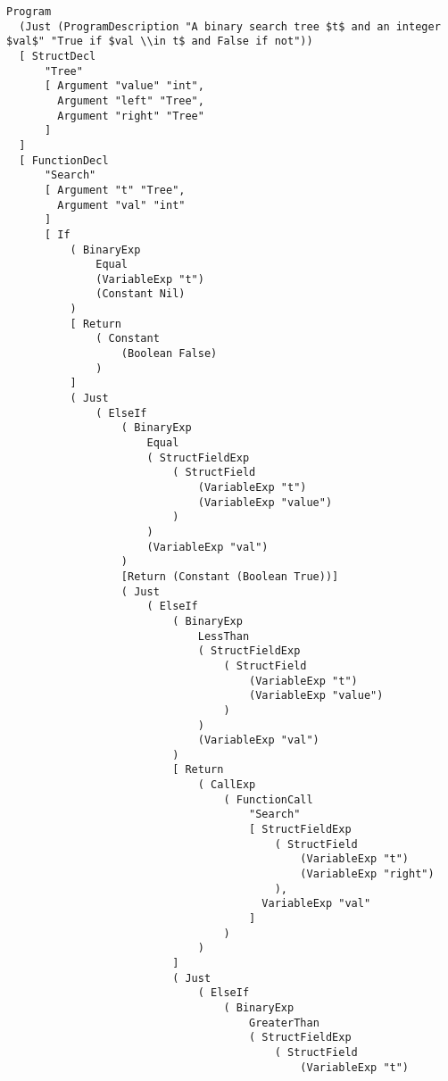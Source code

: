 \begin{lstlisting}
Program
  (Just (ProgramDescription "A binary search tree $t$ and an integer $val$" "True if $val \\in t$ and False if not"))
  [ StructDecl
      "Tree"
      [ Argument "value" "int",
        Argument "left" "Tree",
        Argument "right" "Tree"
      ]
  ]
  [ FunctionDecl
      "Search"
      [ Argument "t" "Tree",
        Argument "val" "int"
      ]
      [ If
          ( BinaryExp
              Equal
              (VariableExp "t")
              (Constant Nil)
          )
          [ Return
              ( Constant
                  (Boolean False)
              )
          ]
          ( Just
              ( ElseIf
                  ( BinaryExp
                      Equal
                      ( StructFieldExp
                          ( StructField
                              (VariableExp "t")
                              (VariableExp "value")
                          )
                      )
                      (VariableExp "val")
                  )
                  [Return (Constant (Boolean True))]
                  ( Just
                      ( ElseIf
                          ( BinaryExp
                              LessThan
                              ( StructFieldExp
                                  ( StructField
                                      (VariableExp "t")
                                      (VariableExp "value")
                                  )
                              )
                              (VariableExp "val")
                          )
                          [ Return
                              ( CallExp
                                  ( FunctionCall
                                      "Search"
                                      [ StructFieldExp
                                          ( StructField
                                              (VariableExp "t")
                                              (VariableExp "right")
                                          ),
                                        VariableExp "val"
                                      ]
                                  )
                              )
                          ]
                          ( Just
                              ( ElseIf
                                  ( BinaryExp
                                      GreaterThan
                                      ( StructFieldExp
                                          ( StructField
                                              (VariableExp "t")

\end{lstlisting}
